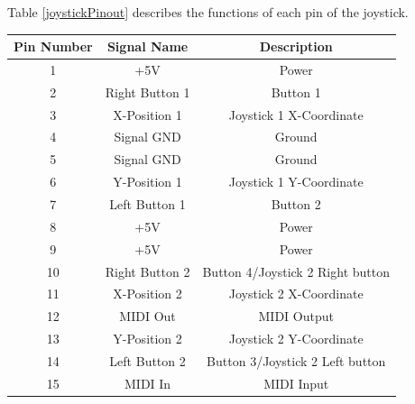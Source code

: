 \begin{minipage}{7in}
Table \ref{joystickPinout} describes the functions of each pin of the joystick.

\centering
\begin{tabular}{ c c c } 
  Pin Number & Signal Name & Description \\
  \hline
 1 & +5V & Power \\
 2 & Right Button 1 & Button 1 \\
 3 & X-Position 1 & Joystick 1 X-Coordinate \\
 4 & Signal GND & Ground \\
 5 & Signal GND & Ground \\
 6 & Y-Position 1 & Joystick 1 Y-Coordinate \\
 7 & Left Button 1 & Button 2 \\
 8 & +5V & Power \\
 9 & +5V & Power \\
 10 & Right Button 2 & Button 4/Joystick 2 Right button \\
 11 & X-Position 2 & Joystick 2 X-Coordinate \\
 12 & MIDI Out & MIDI Output \\
 13 & Y-Position 2 & Joystick 2 Y-Coordinate \\
 14 & Left Button 2 & Button 3/Joystick 2 Left button \\
 15 & MIDI In & MIDI Input \\
\end{tabular}
\label{joystickPinout}

\end{minipage}
\vspace{0.1in}

